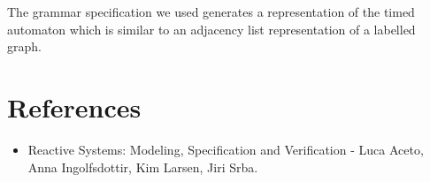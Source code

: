 \documentclass{article}
\begin{document}
The grammar specification we used generates a representation of the
timed automaton which is similar to an adjacency list representation
of a labelled graph.

\section{References}

\begin{itemize}
\item Reactive Systems: Modeling, Specification and Verification -
  Luca Aceto, Anna Ingolfsdottir, Kim Larsen, Jiri Srba.
\end{itemize}
\end{document}
